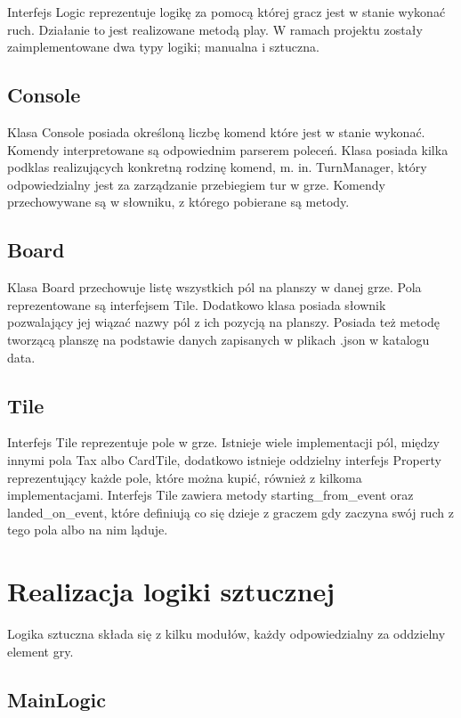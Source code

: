 \documentclass{article}
\begin{document}
Interfejs Logic reprezentuje logikę za pomocą której gracz jest w stanie wykonać ruch. Działanie to jest realizowane metodą play. W ramach projektu zostały zaimplementowane dwa typy logiki; manualna i sztuczna.

\subsection{Console}

Klasa Console posiada określoną liczbę komend które jest w stanie wykonać. Komendy interpretowane są odpowiednim parserem poleceń. Klasa posiada kilka podklas realizujących konkretną rodzinę komend, m. in. TurnManager, który odpowiedzialny jest za zarządzanie przebiegiem tur w grze. Komendy przechowywane są w słowniku, z którego pobierane są metody.

\subsection{Board}

Klasa Board przechowuje listę wszystkich pól na planszy w danej grze. Pola reprezentowane są interfejsem Tile. Dodatkowo klasa posiada słownik pozwalający jej wiązać nazwy pól z ich pozycją na planszy. Posiada też metodę tworzącą planszę na podstawie danych zapisanych w plikach .json w katalogu data.

\subsection{Tile}

Interfejs Tile reprezentuje pole w grze. Istnieje wiele implementacji pól, między innymi pola Tax albo CardTile, dodatkowo istnieje oddzielny interfejs Property reprezentujący każde pole, które można kupić, również z kilkoma implementacjami. Interfejs Tile zawiera metody starting\_from\_event oraz landed\_on\_event, które definiują co się dzieje z graczem gdy zaczyna swój ruch z tego pola albo na nim ląduje.

\section{Realizacja logiki sztucznej}

Logika sztuczna składa się z kilku modułów, każdy odpowiedzialny za oddzielny element gry.

\subsection{MainLogic}
\end{document}

